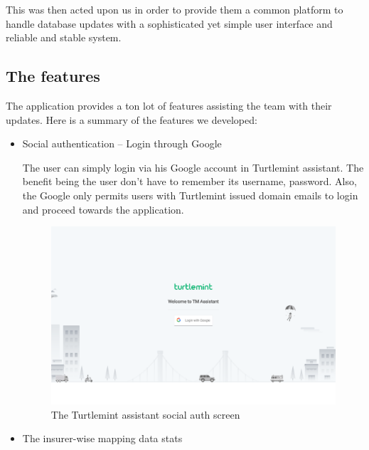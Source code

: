 This was then acted upon us in order to provide them a common platform to
handle database updates with a sophisticated yet simple user interface and
reliable and stable system.

\subsection{The features}
The application provides a ton lot of features assisting the team with their
updates. Here is a summary of the features we developed:

\begin{itemize}
    \item Social authentication -- Login through Google

    The user can simply login via his Google account in Turtlemint assistant.
    The benefit being the user don't have to remember its username, password.
    Also, the Google only permits users with Turtlemint issued domain emails
    to login and proceed towards the application.
    \begin{figure}
        \includegraphics[width=\textwidth]{ch5/tap_social_auth.png}
        \caption{The Turtlemint assistant social auth screen}
    \end{figure}

    \item The insurer-wise mapping data stats


\end{itemize}
